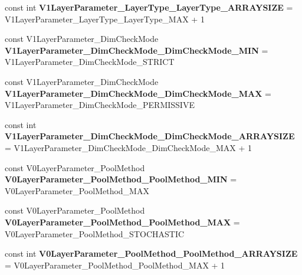 \begin{DoxyCompactItemize}
const int {\bfseries V1\+Layer\+Parameter\+\_\+\+Layer\+Type\+\_\+\+Layer\+Type\+\_\+\+A\+R\+R\+A\+Y\+S\+I\+ZE} = V1\+Layer\+Parameter\+\_\+\+Layer\+Type\+\_\+\+Layer\+Type\+\_\+\+M\+AX + 1
\item 
\mbox{\label{namespacecaffe_a671020a257c9cb2fefa21a40d89bbcea}} 
const V1\+Layer\+Parameter\+\_\+\+Dim\+Check\+Mode {\bfseries V1\+Layer\+Parameter\+\_\+\+Dim\+Check\+Mode\+\_\+\+Dim\+Check\+Mode\+\_\+\+M\+IN} = V1\+Layer\+Parameter\+\_\+\+Dim\+Check\+Mode\+\_\+\+S\+T\+R\+I\+CT
\item 
\mbox{\label{namespacecaffe_ab7c0deec97f6b39e5ca446e6ecb54b63}} 
const V1\+Layer\+Parameter\+\_\+\+Dim\+Check\+Mode {\bfseries V1\+Layer\+Parameter\+\_\+\+Dim\+Check\+Mode\+\_\+\+Dim\+Check\+Mode\+\_\+\+M\+AX} = V1\+Layer\+Parameter\+\_\+\+Dim\+Check\+Mode\+\_\+\+P\+E\+R\+M\+I\+S\+S\+I\+VE
\item 
\mbox{\label{namespacecaffe_a69398bb9dc2d82594efb5c8671b441e0}} 
const int {\bfseries V1\+Layer\+Parameter\+\_\+\+Dim\+Check\+Mode\+\_\+\+Dim\+Check\+Mode\+\_\+\+A\+R\+R\+A\+Y\+S\+I\+ZE} = V1\+Layer\+Parameter\+\_\+\+Dim\+Check\+Mode\+\_\+\+Dim\+Check\+Mode\+\_\+\+M\+AX + 1
\item 
\mbox{\label{namespacecaffe_a710a092085fe3d3de7aafb7e35f981c6}} 
const V0\+Layer\+Parameter\+\_\+\+Pool\+Method {\bfseries V0\+Layer\+Parameter\+\_\+\+Pool\+Method\+\_\+\+Pool\+Method\+\_\+\+M\+IN} = V0\+Layer\+Parameter\+\_\+\+Pool\+Method\+\_\+\+M\+AX
\item 
\mbox{\label{namespacecaffe_afbf57b89693978760bb923666e7b62bc}} 
const V0\+Layer\+Parameter\+\_\+\+Pool\+Method {\bfseries V0\+Layer\+Parameter\+\_\+\+Pool\+Method\+\_\+\+Pool\+Method\+\_\+\+M\+AX} = V0\+Layer\+Parameter\+\_\+\+Pool\+Method\+\_\+\+S\+T\+O\+C\+H\+A\+S\+T\+IC
\item 
\mbox{\label{namespacecaffe_a86b6f4a670db311a50006ca17d69abe2}} 
const int {\bfseries V0\+Layer\+Parameter\+\_\+\+Pool\+Method\+\_\+\+Pool\+Method\+\_\+\+A\+R\+R\+A\+Y\+S\+I\+ZE} = V0\+Layer\+Parameter\+\_\+\+Pool\+Method\+\_\+\+Pool\+Method\+\_\+\+M\+AX + 1
\item 
\mbox{\label{namespacecaffe_a73fbb97175aa192eeca36158c5367c55}} 

\end{DoxyCompactItemize}

